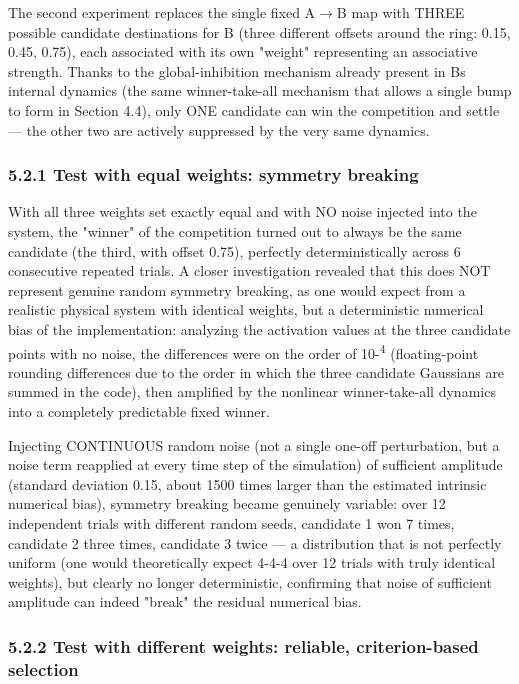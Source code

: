 \documentclass[
  english,
]{article}
\begin{document}
The second experiment replaces the single fixed A$\rightarrow$B map with THREE possible candidate destinations for B (three different offsets around the ring: 0.15, 0.45, 0.75), each associated with its own "weight" representing an associative strength. Thanks to the global-inhibition mechanism already present in B\textquotesingle s internal dynamics (the same winner-take-all mechanism that allows a single bump to form in Section 4.4), only ONE candidate can win the competition and settle --- the other two are actively suppressed by the very same dynamics.

\subsubsection{5.2.1 Test with equal weights: symmetry breaking}\label{test-with-equal-weights-symmetry-breaking}

With all three weights set exactly equal and with NO noise injected into the system, the "winner" of the competition turned out to always be the same candidate (the third, with offset 0.75), perfectly deterministically across 6 consecutive repeated trials. A closer investigation revealed that this does NOT represent genuine random symmetry breaking, as one would expect from a realistic physical system with identical weights, but a deterministic numerical bias of the implementation: analyzing the activation values at the three candidate points with no noise, the differences were on the order of 10-\textsuperscript{4} (floating-point rounding differences due to the order in which the three candidate Gaussians are summed in the code), then amplified by the nonlinear winner-take-all dynamics into a completely predictable fixed winner.

Injecting CONTINUOUS random noise (not a single one-off perturbation, but a noise term reapplied at every time step of the simulation) of sufficient amplitude (standard deviation 0.15, about 1500 times larger than the estimated intrinsic numerical bias), symmetry breaking became genuinely variable: over 12 independent trials with different random seeds, candidate 1 won 7 times, candidate 2 three times, candidate 3 twice --- a distribution that is not perfectly uniform (one would theoretically expect 4-4-4 over 12 trials with truly identical weights), but clearly no longer deterministic, confirming that noise of sufficient amplitude can indeed "break" the residual numerical bias.

\subsubsection{5.2.2 Test with different weights: reliable, criterion-based selection}\label{test-with-different-weights-reliable-criterion-based-selection}
\end{document}
